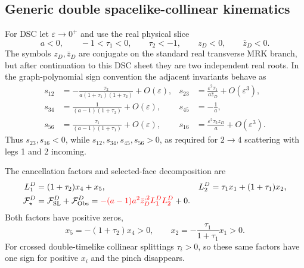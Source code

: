 \documentclass[a4paper,11pt]{article}
\newcommand{\FSL}{\mathcal F_{\rm SL}}
\newcommand{\FObs}{\mathcal F_{\rm Obs}}
\newcommand{\SLcolour}[1]{{\color{red}#1}}
\begin{document}
\subsection{Generic double spacelike-collinear kinematics}

For DSC let \(\varepsilon\to0^+\) and use the real physical slice
\begin{equation}
 a<0,\qquad -1<\tau_1<0,\qquad \tau_2<-1,\qquad
 z_D<0,\qquad \bar z_D<0.
 \label{eq:dsc-domain-example}
\end{equation}
The symbols \(z_D,\bar z_D\) are conjugate on the standard real transverse
MRK branch, but after continuation to this DSC sheet they are two independent
real roots.  In the graph-polynomial sign convention the adjacent invariants
behave as
\begin{align}
 s_{12}&=-\frac{\tau_2}{a(1+\tau_1)(1+\tau_2)}+O(\varepsilon),&
 s_{23}&=\frac{\varepsilon^2\tau_1}{a\bar z_D}+O(\varepsilon^3),\nonumber\\
 s_{34}&=\frac{1}{(a-1)(1+\tau_2)}+O(\varepsilon),&
 s_{45}&=-\frac1a,\nonumber\\
 s_{56}&=\frac{\tau_1}{(a-1)(1+\tau_1)}+O(\varepsilon),&
 s_{16}&=\frac{\varepsilon^2\tau_2z_D}{a}+O(\varepsilon^3).
 \label{eq:dsc-invariants-example}
\end{align}
Thus \(s_{23},s_{16}<0\), while \(s_{12},s_{34},s_{45},s_{56}>0\), as
required for \(2\to4\) scattering with legs 1 and 2 incoming.

The cancellation factors and selected-face decomposition are
\begin{align}
 L_1^D&=(1+\tau_2)x_4+x_5,&
 L_2^D&=\tau_1x_1+(1+\tau_1)x_2,
 \label{eq:dsc-factors-example}\\
 \mathcal F_\star^D&=\FSL^D+\FObs^D
 =\SLcolour{-(a-1)a^2\bar z_D^{,2}L_1^DL_2^D}+0.
 \label{eq:dsc-decomposition-example}
\end{align}
Both factors have positive zeros,
\begin{equation}
 x_5=-(1+\tau_2)x_4>0,\qquad
 x_2=-\frac{\tau_1}{1+\tau_1}x_1>0.
 \label{eq:dsc-positive-pinch-example}
\end{equation}
For crossed double-timelike collinear splittings \(\tau_i>0\), so these
same factors have one sign for positive \(x_i\) and the pinch disappears.
\end{document}
